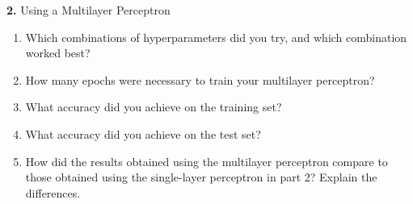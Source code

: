 \documentclass[titlepage]{article}
\begin{document}
\pagebreak

\noindent \textbf{2. } Using a Multilayer Perceptron \\

\begin{enumerate}
	\item Which combinations of hyperparameters did you try, and which combination worked best?
	\item How many epochs were necessary to train your multilayer perceptron?
	\item What accuracy did you achieve on the training set?
	\item What accuracy did you achieve on the test set?	
	\item How did the results obtained using the multilayer perceptron compare to those obtained using the single-layer perceptron in part 2? Explain the differences.
\end{enumerate}
\end{document}
